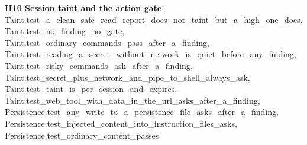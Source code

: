 \documentclass[10pt,a4paper]{article}
\begin{document}
\textbf{H10 Session taint and the action gate}: \textcolor{ok}{Taint.\allowbreak{}test\_\allowbreak{}a\_\allowbreak{}clean\_\allowbreak{}safe\_\allowbreak{}read\_\allowbreak{}report\_\allowbreak{}does\_\allowbreak{}not\_\allowbreak{}taint\_\allowbreak{}but\_\allowbreak{}a\_\allowbreak{}high\_\allowbreak{}one\_\allowbreak{}does}, \textcolor{ok}{Taint.\allowbreak{}test\_\allowbreak{}no\_\allowbreak{}finding\_\allowbreak{}no\_\allowbreak{}gate}, \textcolor{ok}{Taint.\allowbreak{}test\_\allowbreak{}ordinary\_\allowbreak{}commands\_\allowbreak{}pass\_\allowbreak{}after\_\allowbreak{}a\_\allowbreak{}finding}, \textcolor{ok}{Taint.\allowbreak{}test\_\allowbreak{}reading\_\allowbreak{}a\_\allowbreak{}secret\_\allowbreak{}without\_\allowbreak{}network\_\allowbreak{}is\_\allowbreak{}quiet\_\allowbreak{}before\_\allowbreak{}any\_\allowbreak{}finding}, \textcolor{ok}{Taint.\allowbreak{}test\_\allowbreak{}risky\_\allowbreak{}commands\_\allowbreak{}ask\_\allowbreak{}after\_\allowbreak{}a\_\allowbreak{}finding}, \textcolor{ok}{Taint.\allowbreak{}test\_\allowbreak{}secret\_\allowbreak{}plus\_\allowbreak{}network\_\allowbreak{}and\_\allowbreak{}pipe\_\allowbreak{}to\_\allowbreak{}shell\_\allowbreak{}always\_\allowbreak{}ask}, \textcolor{ok}{Taint.\allowbreak{}test\_\allowbreak{}taint\_\allowbreak{}is\_\allowbreak{}per\_\allowbreak{}session\_\allowbreak{}and\_\allowbreak{}expires}, \textcolor{ok}{Taint.\allowbreak{}test\_\allowbreak{}web\_\allowbreak{}tool\_\allowbreak{}with\_\allowbreak{}data\_\allowbreak{}in\_\allowbreak{}the\_\allowbreak{}url\_\allowbreak{}asks\_\allowbreak{}after\_\allowbreak{}a\_\allowbreak{}finding}, \textcolor{ok}{Persistence.\allowbreak{}test\_\allowbreak{}any\_\allowbreak{}write\_\allowbreak{}to\_\allowbreak{}a\_\allowbreak{}persistence\_\allowbreak{}file\_\allowbreak{}asks\_\allowbreak{}after\_\allowbreak{}a\_\allowbreak{}finding}, \textcolor{ok}{Persistence.\allowbreak{}test\_\allowbreak{}injected\_\allowbreak{}content\_\allowbreak{}into\_\allowbreak{}instruction\_\allowbreak{}files\_\allowbreak{}asks}, \textcolor{ok}{Persistence.\allowbreak{}test\_\allowbreak{}ordinary\_\allowbreak{}content\_\allowbreak{}passes}\par
\end{document}
